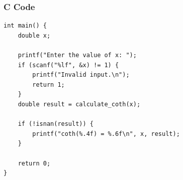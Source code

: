\documentclass{beamer}
\begin{document}
\begin{frame}[fragile]
\frametitle{C Code}
\begin{lstlisting}
int main() {
    double x;

    printf("Enter the value of x: ");
    if (scanf("%lf", &x) != 1) {
        printf("Invalid input.\n");
        return 1;
    }
    double result = calculate_coth(x);

    if (!isnan(result)) {
        printf("coth(%.4f) = %.6f\n", x, result);
    }

    return 0;
}
\end{lstlisting}
\end{frame}
\end{document}
